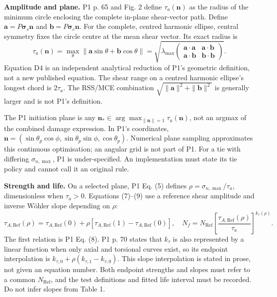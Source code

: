 \documentclass[10pt,a4paper]{article}
\newcommand{\lab}[1]{\textbf{#1.}}
\newcommand{\ta}{\tau_{a}}
\begin{document}
\lab{Amplitude and plane} P1 p. 65 and Fig. 2 define $\ta(\mathbf n)$ as the radius of the minimum circle enclosing the complete in-plane shear-vector path. Define $\mathbf a=P\boldsymbol\sigma_s\mathbf n$ and $\mathbf b=P\boldsymbol\sigma_c\mathbf n$. For the complete, centred harmonic ellipse, central symmetry fixes the circle centre at the mean shear vector. Its exact radius is
\begin{equation}
\ta(\mathbf n)=\max_\theta\|\mathbf a\sin\theta+\mathbf b\cos\theta\|
=\sqrt{\lambda_{\max}\!\begin{pmatrix}\mathbf a\cdot\mathbf a&\mathbf a\cdot\mathbf b\\\mathbf a\cdot\mathbf b&\mathbf b\cdot\mathbf b\end{pmatrix}}. \label{eq:mcc-amplitude}
\end{equation}
Equation D4 is an independent analytical reduction of P1's geometric definition, not a new published equation. The shear range on a centred harmonic ellipse's longest chord is $2\ta$. The RSS/MCE combination $\sqrt{\|\mathbf a\|^2+\|\mathbf b\|^2}$ is generally larger and is not P1's definition.

The P1 initiation plane is any $\mathbf n_*\in\arg\max_{\|\mathbf n\|=1}\ta(\mathbf n)$, not an argmax of the combined damage expression. In P1's coordinates, $\mathbf n=(\sin\theta_p\cos\phi,\sin\theta_p\sin\phi,\cos\theta_p)$. Numerical plane sampling approximates this continuous optimisation; an angular grid is not part of P1. For a tie with differing $\sigma_{n,\max}$, P1 is under-specified. An implementation must state its tie policy and cannot call it an original rule.

\lab{Strength and life} On a selected plane, P1 Eq. (5) defines $\rho=\sigma_{n,\max}/\ta$, dimensionless when $\ta>0$. Equations (7)--(9) use a reference shear amplitude and inverse W\"ohler slope depending on $\rho$:
\begin{equation}
\tau_{A,\mathrm{Ref}}(\rho)=\tau_{A,\mathrm{Ref}}(0)+\rho[\tau_{A,\mathrm{Ref}}(1)-\tau_{A,\mathrm{Ref}}(0)],\quad
N_f=N_{\mathrm{Ref}}\left[\frac{\tau_{A,\mathrm{Ref}}(\rho)}{\ta}\right]^{k_\tau(\rho)}. \label{eq:modified-wohler}
\end{equation}
The first relation is P1 Eq. (8). P1 p. 70 states that $k_\tau$ is also represented by a linear function when only axial and torsional curves exist, so its endpoint interpolation is $k_{\tau,0}+\rho(k_{\tau,1}-k_{\tau,0})$. This slope interpolation is stated in prose, not given an equation number. Both endpoint strengths and slopes must refer to a common $N_{\mathrm{Ref}}$, and the test definitions and fitted life interval must be recorded. Do not infer slopes from Table 1.
\end{document}
